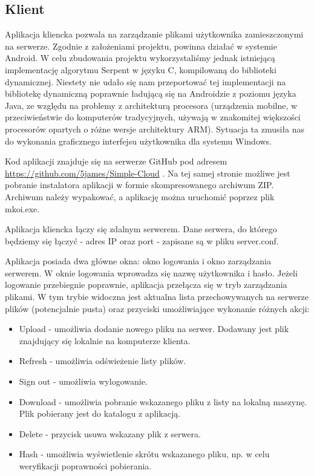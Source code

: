 \documentclass{article}
\begin{document}
	\subsection{Klient}
	Aplikacja kliencka pozwala na zarządzanie plikami użytkownika zamieszczonymi na serwerze. Zgodnie z założeniami projektu, powinna działać w systemie Android. W celu zbudowania projektu wykorzystaliśmy jednak istniejącą implementację algorytmu Serpent w języku C, kompilowaną do biblioteki dynamicznej. Niestety nie udało się nam przeportować tej implementacji na bibliotekę dynamiczną poprawnie ładującą się na Androidzie z poziomu języka Java, ze względu na problemy z architekturą procesora (urządzenia mobilne, w przeciwieństwie do komputerów tradycyjnych, używają w znakomitej większości procesorów opartych o różne wersje architektury ARM). Sytuacja ta zmusiła nas do wykonania graficznego interfejsu użytkownika dla systemu Windows. 
	
	Kod aplikacji znajduje się na serwerze GitHub pod adresem \url{https://github.com/5james/Simple-Cloud} . Na tej samej stronie możliwe jest pobranie instalatora aplikacji w formie skompresowanego archiwum ZIP. Archiwum należy wypakować, a aplikację można uruchomić poprzez plik mkoi.exe. 
	
	Aplikacja kliencka łączy się zdalnym serwerem. Dane serwera, do którego będziemy się łączyć - adres IP oraz port - zapisane są w pliku server.conf. 
	
	Aplikacja posiada dwa główne okna: okno logowania i okno zarządzania serwerem. W oknie logowania wprowadza się nazwę użytkownika i hasło. Jeżeli logowanie przebiegnie poprawnie, aplikacja przełącza się w tryb zarządzania plikami. W tym trybie widoczna jest aktualna lista przechowywanych na serwerze plików (potencjalnie pusta) oraz przyciski umożliwiające wykonanie różnych akcji:
	\begin{itemize}
		\item Upload - umożliwia dodanie nowego pliku na serwer. Dodawany jest plik znajdujący się lokalnie na komputerze klienta. 
		\item Refresh - umożliwia odświeżenie listy plików. 
		\item Sign out - umożliwia wylogowanie. 
		\item Download - umożliwia pobranie wskazanego pliku z listy na lokalną maszynę. Plik pobierany jest do katalogu z aplikacją. 
		\item Delete - przycisk usuwa wskazany plik z serwera. 
		\item Hash - umożliwia wyświetlenie skrótu wskazanego pliku, np. w celu weryfikacji poprawności pobierania. 
	\end{itemize}
	
\end{document}
